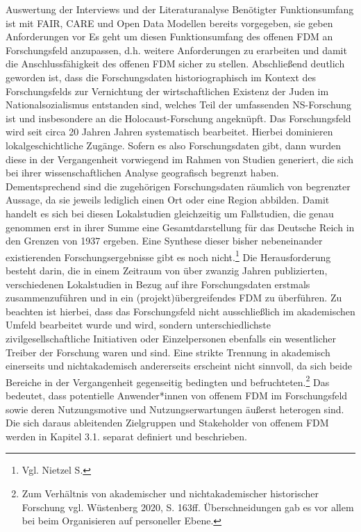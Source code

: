 Auswertung der Interviews und der Literaturanalyse
Benötigter Funktionsumfang ist mit FAIR, CARE und Open Data Modellen bereits vorgegeben, sie geben Anforderungen vor
Es geht um diesen Funktionsumfang des offenen FDM an Forschungsfeld anzupassen, d.h. weitere Anforderungen zu erarbeiten und damit die Anschlussfähigkeit des offenen FDM sicher zu stellen.
Abschließend deutlich geworden ist, dass die Forschungsdaten historiographisch im  Kontext des Forschungsfelds zur Vernichtung der wirtschaftlichen Existenz der Juden im Nationalsozialismus entstanden sind, welches Teil der umfassenden NS-Forschung ist und insbesondere an die Holocaust-Forschung angeknüpft. Das Forschungsfeld wird seit circa 20 Jahren Jahren systematisch bearbeitet. Hierbei dominieren lokalgeschichtliche Zugänge. Sofern es also Forschungsdaten gibt, dann wurden diese in der Vergangenheit vorwiegend im Rahmen von Studien generiert, die sich bei ihrer wissenschaftlichen Analyse geografisch begrenzt haben. Dementsprechend sind die zugehörigen Forschungsdaten räumlich von begrenzter Aussage, da sie jeweils lediglich einen Ort oder eine Region abbilden. Damit handelt es sich bei diesen Lokalstudien gleichzeitig um Fallstudien, die genau genommen erst in ihrer Summe eine Gesamtdarstellung für das Deutsche Reich in den Grenzen von 1937 ergeben. Eine Synthese dieser bisher nebeneinander existierenden Forschungsergebnisse gibt es noch nicht.\footnote{Vgl. Nietzel S.} Die Herausforderung besteht darin, die in einem Zeitraum von über zwanzig Jahren publizierten, verschiedenen Lokalstudien in Bezug auf ihre Forschungsdaten erstmals zusammenzuführen und in ein (projekt)übergreifendes FDM zu überführen. Zu beachten ist hierbei, dass das Forschungsfeld nicht ausschließlich im akademischen Umfeld bearbeitet wurde und wird, sondern unterschiedlichste zivilgesellschaftliche Initiativen oder Einzelpersonen ebenfalls ein wesentlicher Treiber der Forschung waren und sind. Eine strikte Trennung in akademisch einerseits und nichtakademisch andererseits erscheint nicht sinnvoll, da sich beide Bereiche in der Vergangenheit gegenseitig bedingten und befruchteten.\footnote{Zum Verhältnis von akademischer und nichtakademischer historischer Forschung vgl. Wüstenberg 2020, S. 163ff. Überschneidungen gab es vor allem bei beim Organisieren auf personeller Ebene.} Das bedeutet, dass potentielle Anwender*innen von offenem FDM im Forschungsfeld sowie deren Nutzungsmotive und Nutzungserwartungen äußerst heterogen sind. Die sich daraus ableitenden Zielgruppen und Stakeholder von offenem FDM werden in Kapitel 3.1. separat definiert und beschrieben.

